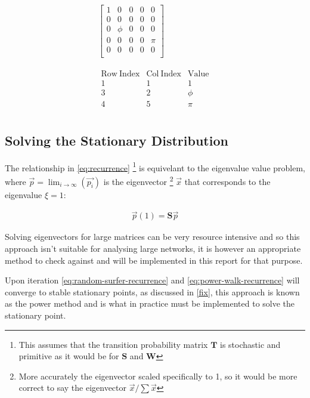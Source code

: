 \documentclass[11pt]{article}
\begin{document}
\begin{align}
    \begin{bmatrix}
	1 & 0 & 0 & 0 & 0 \\
	0 & 0 & 0 & 0 & 0 \\
	0 & \phi & 0 & 0 & 0 \\
	0 & 0 & 0 & 0 & \pi \\
	0 & 0 & 0 & 0 & 0 \\
    \end{bmatrix}  \label{eq:ordinary} \\
    \ \nonumber \\
    \ \nonumber \\
    \begin{matrix}
	\mathrm{Row\ Index} & \mathrm{Col\ Index} & \mathrm{Value}\\
	1 & 1 & 1 \\
	3 & 2 & \phi \\
	4 & 5 & \pi \\
    \end{matrix}  \label{eq:crc}
\end{align}


\subsection{Solving the Stationary Distribution}
\label{solving-stationary-dist}
The relationship in \eqref{eq:recurrence} \footnote{This assumes that the transition probability matrix \(\mathbf{T}\) is stochastic and primitive as it would be for \(\mathbf{S}\)
and \(\mathbf{W}\)} is equivelant to the eigenvalue value problem, where
\(\vec{p} = \lim_{i \rightarrow \infty} \left( \vec{p_{i}}\right)\) is the
eigenvector \footnote{More accurately the eigenvector scaled specifically to 1, so it would be more correct to say the eigenvector \(\vec{x} / \sum \vec{x}\)} \(\vec{x}\) that corresponds to the eigenvalue \(\xi=1\):

\begin{align}
\vec{p} (1) = \mathbf{S} \vec{p} \label{eq:eigenprob}
\end{align}

Solving eigenvectors for large matrices can be very resource intensive and so
this approach isn't suitable for analysing large networks, it is however an appropriate method to check against and will be implemented in this report for that purpose.

Upon iteration \eqref{eq:random-surfer-recurrence} and \eqref{eq:power-walk-recurrence} will converge to stable stationary points, as discussed
in \ref{fix}, this approach is known as the power method
\cite{larsonElementaryLinearAlgebra1991a} and is what in practice must be
implemented to solve the stationary point.
\end{document}

